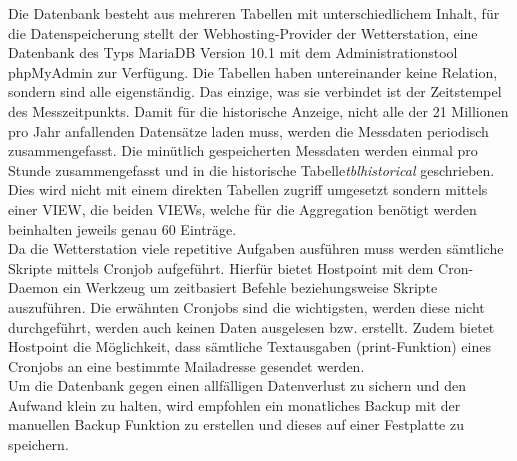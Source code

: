 \documentclass[10pt]{article}
\begin{document}
\begin{multicols}{2}
Die Datenbank besteht aus mehreren Tabellen mit unterschiedlichem Inhalt, für die Datenspeicherung stellt der Webhosting-Provider der Wetterstation, eine Datenbank des Typs MariaDB Version 10.1 mit dem Administrationstool phpMyAdmin zur Verfügung. Die Tabellen haben untereinander keine Relation, sondern sind alle eigenständig. Das einzige, was sie verbindet ist der Zeitstempel des Messzeitpunkts. Damit für die historische Anzeige, nicht alle der 21 Millionen pro Jahr anfallenden Datensätze laden muss, werden die Messdaten periodisch zusammengefasst. Die minütlich gespeicherten Messdaten werden einmal pro Stunde zusammengefasst und in die historische Tabelle\emph{tblhistorical} geschrieben. Dies wird nicht mit einem direkten Tabellen zugriff umgesetzt sondern mittels einer VIEW, die beiden VIEWs, welche für die Aggregation benötigt werden beinhalten jeweils genau 60 Einträge.\\
Da die Wetterstation viele repetitive Aufgaben ausführen muss werden sämtliche Skripte mittels Cronjob aufgeführt. Hierfür  bietet Hostpoint mit dem Cron-Daemon ein Werkzeug um zeitbasiert Befehle beziehungsweise Skripte auszuführen. Die erwähnten Cronjobs sind die wichtigsten, werden diese nicht durchgeführt, werden auch keinen Daten ausgelesen bzw. erstellt. Zudem bietet Hostpoint die Möglichkeit, dass sämtliche Textausgaben (print-Funktion) eines Cronjobs an eine bestimmte Mailadresse gesendet werden.\\
Um die Datenbank gegen einen allfälligen Datenverlust zu sichern und den Aufwand klein zu halten, wird empfohlen ein monatliches Backup mit der manuellen Backup Funktion zu erstellen und dieses auf einer Festplatte zu speichern.

\end{multicols}
\end{document}

